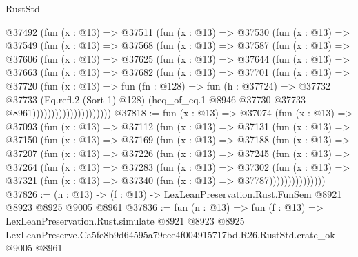 \begin{lexlean}{RustStd}
\begin{coremodule}
                @37492
                  (fun (x : @13) =>
                  @37511
                    (fun (x : @13) =>
                    @37530
                      (fun (x : @13) =>
                      @37549
                        (fun (x : @13) =>
                        @37568
                          (fun (x : @13) =>
                          @37587
                            (fun (x : @13) =>
                            @37606
                              (fun (x : @13) =>
                              @37625
                                (fun (x : @13) =>
                                @37644
                                  (fun (x : @13) =>
                                  @37663
                                    (fun (x : @13) =>
                                    @37682
                                      (fun (x : @13) =>
                                      @37701
                                        (fun (x : @13) =>
                                        @37720
                                          (fun (x : @13) =>
                                          fun (fn : @128) =>
                                          fun (h : @37724) =>
                                          @37732
                                            @37733
                                            (Eq.refl.{2} (Sort 1) @128)
                                            (heq_of_eq.{1}
                                              @8946
                                              @37730
                                              @37733
                                              @8961)))))))))))))))))))))
@37818 := fun (x : @13) =>
  @37074
    (fun (x : @13) =>
    @37093
      (fun (x : @13) =>
      @37112
        (fun (x : @13) =>
        @37131
          (fun (x : @13) =>
          @37150
            (fun (x : @13) =>
            @37169
              (fun (x : @13) =>
              @37188
                (fun (x : @13) =>
                @37207
                  (fun (x : @13) =>
                  @37226
                    (fun (x : @13) =>
                    @37245
                      (fun (x : @13) =>
                      @37264
                        (fun (x : @13) =>
                        @37283
                          (fun (x : @13) =>
                          @37302
                            (fun (x : @13) =>
                            @37321 (fun (x : @13) => @37340 (fun (x : @13) => @37787)))))))))))))))
@37826 := (n : @13) -> (f : @13) -> LexLeanPreservation.Rust.FunSem @8921 @8923 @8925 @9005 @8961
@37836 := fun (n : @13) =>
  fun (f : @13) =>
  LexLeanPreservation.Rust.simulate
    @8921
    @8923
    @8925
    LexLeanPreserve.Ca5fe8b9d64595a79eee4f004915717bd.R26.RustStd.crate_ok
    @9005
    @8961
\end{coremodule}
\end{lexlean}
